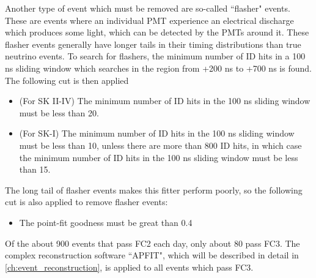 \par
Another type of event which must be removed are so-called ``flasher" events.  These are events where an individual PMT experience an electrical discharge which produces some light, which can be detected by the PMTs around it.  These flasher events generally have longer tails in their timing distributions than true neutrino events.  To search for flashers, the minimum number of ID hits in a 100 ns sliding window which searches in the region from +200 ns to +700 ns is found.  The following cut is then applied
\begin{itemize}
\item (For SK II-IV) The minimum number of ID hits in the 100 ns sliding window must be less than 20.
\item (For SK-I) The minimum number of ID hits in the 100 ns sliding window must be less than 10, unless there are more than 800 ID hits, in which case the minimum number of ID hits in the 100 ns sliding window must be less than 15.
\end{itemize}
The long tail of flasher events makes this fitter perform poorly, so the following cut is also applied to remove flasher events:
\begin{itemize}
\item The point-fit goodness must be great than 0.4
\end{itemize}
\par
Of the about 900 events that pass FC2 each day, only about 80 pass FC3.  The complex reconstruction software ``APFIT", which will be described in detail in \cref{ch:event_reconstruction}, is applied to all events which pass FC3.
